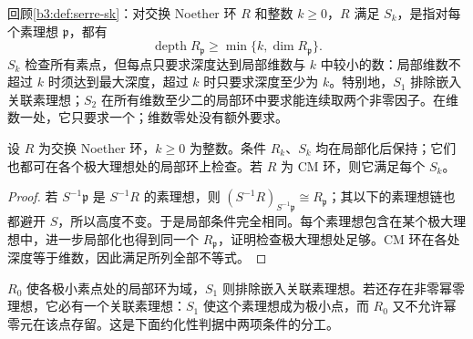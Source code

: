回顾\cref{b3:def:serre-sk}：对交换 Noether 环 \(R\) 和整数 \(k\ge0\)，\(R\) 满足 \(S_k\)，是指对每个素理想 \(\mathfrak p\)，都有
\[
	\operatorname{depth}R_{\mathfrak p}\ge\min\{k,\dim R_{\mathfrak p}\}.
\]
\(S_k\) 检查所有素点，但每点只要求深度达到局部维数与 \(k\) 中较小的数：局部维数不超过 \(k\) 时须达到最大深度，超过 \(k\) 时只要求深度至少为 \(k\)。特别地，\(S_1\) 排除嵌入关联素理想；\(S_2\) 在所有维数至少二的局部环中要求能连续取两个非零因子。在维数一处，它只要求一个；维数零处没有额外要求。

\begin{proposition}\label{b3:prop:serre-conditions-localize}
	设 \(R\) 为交换 Noether 环，\(k\ge0\) 为整数。条件 \(R_k\)、\(S_k\) 均在局部化后保持；它们也都可在各个极大理想处的局部环上检查。若 \(R\) 为 CM 环，则它满足每个 \(S_k\)。
\end{proposition}
\begin{proof}
	若 \(S^{-1}\mathfrak p\) 是 \(S^{-1}R\) 的素理想，则 \((S^{-1}R)_{S^{-1}\mathfrak p}\cong R_{\mathfrak p}\)；其以下的素理想链也都避开 \(S\)，所以高度不变。于是局部条件完全相同。每个素理想包含在某个极大理想中，进一步局部化也得到同一个 \(R_{\mathfrak p}\)，证明检查极大理想处足够。CM 环在各处深度等于维数，因此满足所列全部不等式。
\end{proof}

\(R_0\) 使各极小素点处的局部环为域，\(S_1\) 则排除嵌入关联素理想。若还存在非零幂零理想，它必有一个关联素理想：\(S_1\) 使这个素理想成为极小点，而 \(R_0\) 又不允许幂零元在该点存留。这是下面约化性判据中两项条件的分工。

